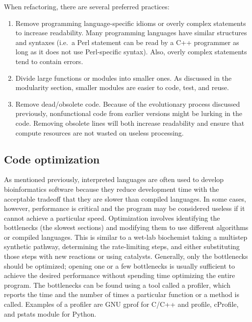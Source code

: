 \documentclass[ChapterTOCs,krantz2]{krantz} %
\begin{document}
When refactoring, there are several preferred practices:  
\begin{enumerate}

\item Remove programming
language-specific idioms or overly complex statements to increase readability.
Many programming languages have similar structures and syntaxes (i.e.\ a Perl
statement can be read by a C++ programmer as long as it does not
use Perl-specific syntax).  Also, overly complex statements 
tend to contain errors.  

\item Divide large
functions or modules into smaller ones.  As discussed in the
modularity section, smaller modules are easier to code, test, and reuse.  

\item Remove dead/obsolete code.  Because of the evolutionary process 
discussed previously,
nonfunctional code from earlier versions might be lurking in the code.
Removing obsolete lines will both increase readability and ensure that compute
resources are not wasted on useless processing.
\end{enumerate}

\subsection{Code optimization}

As mentioned previously, interpreted
languages are often used to develop bioinformatics software because they
reduce development time with the acceptable tradeoff that they are
slower than compiled languages. In some cases, however, performance is critical
and the program may be considered useless if it cannot achieve a particular
speed.  
Optimization involves identifying the bottlenecks (the slowest
sections) and modifying them to use different algorithms or
compiled languages.  This is similar to a wet-lab biochemist taking a multistep
synthetic pathway, determining the rate-limiting steps, and either
substituting those steps with new reactions or using catalysts.  Generally, 
only the
bottlenecks should be optimized; opening one or a few bottlenecks is usually
sufficient to achieve the desired performance without spending time optimizing
the entire program.  The bottlenecks can be found using a tool called a profiler,
which reports the time and the number of times a particular
function or a method is called.
Examples of a profiler are GNU gprof for C/C++ and profile,
cProfile, and pstats module for Python.
\end{document}
